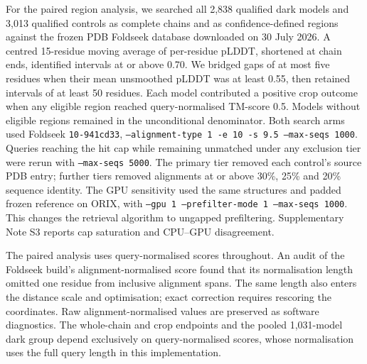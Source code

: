 For the paired region analysis, we searched all 2{,}838 qualified dark models and 3{,}013
qualified controls as complete chains and as confidence-defined regions against the frozen
PDB Foldseek database downloaded on 30 July 2026. A centred 15-residue moving average of
per-residue pLDDT, shortened at chain ends, identified intervals at or above 0.70.
We bridged gaps of at most five residues when their mean unsmoothed pLDDT was at least 0.55,
then retained intervals of at least 50 residues. Each model contributed a positive crop outcome
when any eligible region reached query-normalised TM-score 0.5. Models without eligible
regions remained in the unconditional denominator. Both search arms used Foldseek
\texttt{10-941cd33}, \texttt{--alignment-type 1 -e 10 -s 9.5 --max-seqs 1000}.
Queries reaching the hit cap while remaining unmatched under any exclusion tier were rerun
with \texttt{--max-seqs 5000}. The primary tier removed each control's source PDB entry;
further tiers removed alignments at or above 30\%, 25\% and 20\% sequence identity.
The GPU sensitivity used the same structures and padded frozen reference on ORIX, with
\texttt{--gpu 1 --prefilter-mode 1 --max-seqs 1000}. This changes the retrieval algorithm to
ungapped prefiltering. Supplementary Note S3 reports cap saturation and CPU--GPU disagreement.

The paired analysis uses query-normalised scores throughout. An audit of the Foldseek build's
alignment-normalised score found that its normalisation length omitted one residue from
inclusive alignment spans. The same length also enters the distance scale and optimisation;
exact correction requires rescoring the coordinates. Raw alignment-normalised values are
preserved as software diagnostics. The whole-chain and crop endpoints and the pooled
1{,}031-model dark group depend exclusively on query-normalised scores, whose normalisation
uses the full query length in this implementation.
